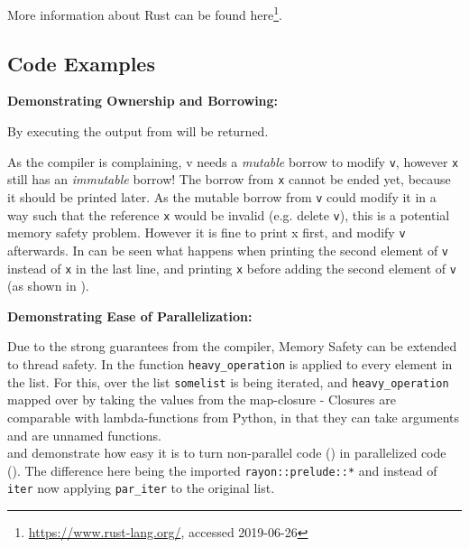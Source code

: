 More information about Rust can be found
here\footnote{\url{https://www.rust-lang.org/}, accessed 2019-06-26}.




\newpage
\subsection{Code Examples}\label{sec:examples}

\textbf{Demonstrating Ownership and Borrowing:}

By executing  the output from  will be returned.



As the compiler is complaining, v needs a {\em mutable} borrow to modify
\verb|v|, however \verb|x| still has an {\em immutable} borrow! The borrow from
\verb|x| cannot be ended yet, because it should be printed later. As the mutable
borrow from \verb|v| could modify it in a way such that the reference \verb|x|
would be invalid (e.g. delete \verb|v|), this is a potential memory safety problem.
However it is fine to print x first, and modify \verb|v| afterwards. In
 can be seen what happens when printing the second element of
\verb|v| instead of \verb|x| in the last line, and printing \verb|x| before
adding the second element of \verb|v| (as shown in ).



\newpage
\textbf{Demonstrating Ease of Parallelization:}

Due to the strong guarantees from the compiler, Memory Safety can be extended
to thread safety. In  the function \verb|heavy_operation| is
applied to every element in the list. For this, over the list \verb|somelist|
is being iterated, and \verb|heavy_operation| mapped over by taking the values
from the map-closure - Closures are comparable with lambda-functions from
Python, in that they can take arguments and are unnamed functions. \\
 and  demonstrate how easy it is to turn
non-parallel code () in parallelized code ().
The difference here being the imported \verb|rayon::prelude::*| and instead of
\verb|iter| now applying \verb|par_iter| to the original list.



